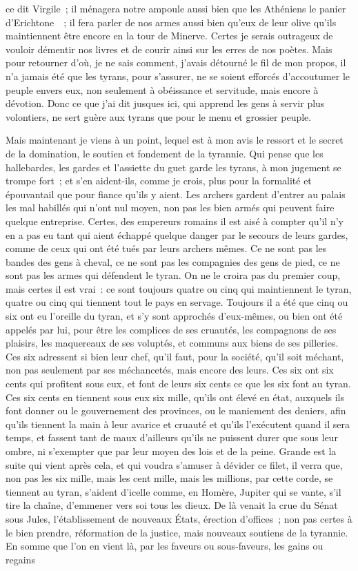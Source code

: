 \documentclass[french,twoside]{book} %
\begin{document}
\noindent ce dit Virgile ; il ménagera notre ampoule aussi bien que les Athéniens le panier d’Erichtone  ; il fera parler de nos armes aussi bien qu’eux de leur olive qu’ils maintiennent être encore en la tour de Minerve. Certes je serais outrageux de vouloir démentir nos livres et de courir ainsi sur les erres de nos poètes. Mais pour retourner d’où, je ne sais comment, j’avais détourné le fil de mon propos, il n’a jamais été que les tyrans, pour s’assurer, ne se soient efforcés d’accoutumer le peuple envers eux, non seulement à obéissance et servitude, mais encore à dévotion. Donc ce que j’ai dit jusques ici, qui apprend les gens à servir plus volontiers, ne sert guère aux tyrans que pour le menu et grossier peuple.\par
Mais maintenant je viens à un point, lequel est à mon avis le ressort et le secret de la domination, le soutien et fondement de la tyrannie. Qui pense que les hallebardes, les gardes et l’assiette du guet garde les tyrans, à mon jugement se trompe fort ; et s’en aident-ils, comme je crois, plus pour la formalité et épouvantail que pour fiance qu’ils y aient. Les archers gardent d’entrer au palais les mal habillés qui n’ont nul moyen, non pas les bien armés qui peuvent faire quelque entreprise. Certes, des empereurs romains il est aisé à compter qu’il n’y en a pas eu tant qui aient échappé quelque danger par le secours de leurs gardes, comme de ceux qui ont été tués par leurs archers mêmes. Ce ne sont pas les bandes des gens à cheval, ce ne sont pas les compagnies des gens de pied, ce ne sont pas les armes qui défendent le tyran. On ne le croira pas du premier coup, mais certes il est vrai : ce sont toujours quatre ou cinq qui maintiennent le tyran, quatre ou cinq qui tiennent tout le pays en servage. Toujours il a été que cinq ou six ont eu l’oreille du tyran, et s’y sont approchés d’eux-mêmes, ou bien ont été appelés par lui, pour être les complices de ses cruautés, les compagnons de ses plaisirs, les maquereaux de ses voluptés, et communs aux biens de ses pilleries. Ces six adressent si bien leur chef, qu’il faut, pour la société, qu’il soit méchant, non pas seulement par ses méchancetés, mais encore des leurs. Ces six ont six cents qui profitent sous eux, et font de leurs six cents ce que les six font au tyran. Ces six cents en tiennent sous eux six mille, qu’ils ont élevé en état, auxquels ils font donner ou le gouvernement des provinces, ou le maniement des deniers, afin qu’ils tiennent la main à leur avarice et cruauté et qu’ils l’exécutent quand il sera temps, et fassent tant de maux d’ailleurs qu’ils ne puissent durer que sous leur ombre, ni s’exempter que par leur moyen des lois et de la peine. Grande est la suite qui vient après cela, et qui voudra s’amuser à dévider ce filet, il verra que, non pas les six mille, mais les cent mille, mais les millions, par cette corde, se tiennent au tyran, s’aident d’icelle comme, en Homère, Jupiter qui se vante, s’il tire la chaîne, d’emmener vers soi tous les dieux. De là venait la crue du Sénat sous Jules, l’établissement de nouveaux États, érection d’offices ; non pas certes à le bien prendre, réformation de la justice, mais nouveaux soutiens de la tyrannie. En somme que l’on en vient là, par les faveurs ou sous-faveurs, les gains ou regains 
\end{document}
